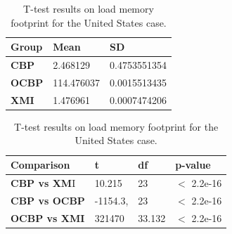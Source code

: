 \documentclass{llncs}
\begin{document}
    
    \begin{table}[ht]
        \centering
        \label{table:ttest_load_memory_wikipedia}
        \caption{T-test results on load memory footprint for the United States case.}
        \begin{minipage}{0.44\textwidth}
            \centering
            \begin{tabular}{|p{}|p{}|p{}|}
                \hline 
                \textbf{Group}  & \textbf{Mean} & \textbf{SD} \\ 
                \hline 
                \textbf{CBP} & 2.468129     & 0.4753551354 \\ 
                \hline 
                \textbf{OCBP} & 114.476037  &  0.0015513435 \\ 
                \hline 
                \textbf{XMI} &  1.476961  &  0.0007474206 \\ 
                \hline 
            \end{tabular} 
        \end{minipage}
        \hfill
        \begin{minipage}{0.54\textwidth}
            \centering
            \begin{tabular}{|p{}|p{}|p{}|p{}|}
                \hline 
                \textbf{Comparison} & \textbf{t}  & \textbf{df} & \textbf{p-value} \\ 
                \hline 
                \textbf{CBP vs XM}I & 10.215   &23 & $<$ 2.2e-16 \\ 
                \hline 
                \textbf{CBP vs OCBP} & -1154.3, &23 & $<$ 2.2e-16 \\ 
                \hline 
                \textbf{OCBP vs XMI} &321470  &33.132 & $<$ 2.2e-16 \\ 
                \hline 
            \end{tabular} 
        \end{minipage}
    \end{table}
    
\end{document}
